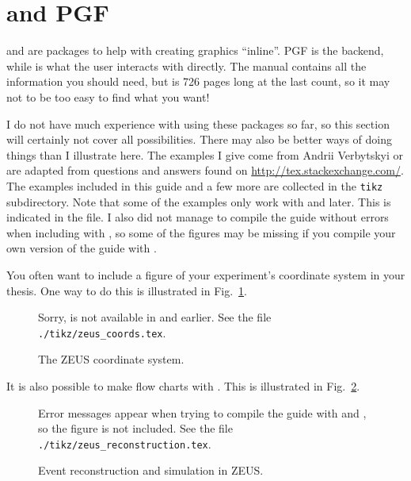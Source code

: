 \section{\TikZ and PGF}
\label{sec:fig:tikz}

 and  are packages to help with creating
graphics \enquote{inline}.  PGF is the backend, while \TikZ is what
the user interacts with directly. The manual contains all the
information you should need, but is 726 pages long at the last count,
so it may not to be too easy to find what you want!

I do not have much experience with using these packages so far, so
this section will certainly not cover all possibilities. There may
also be better ways of doing things than I illustrate here. The
examples I give come from Andrii Verbytskyi or are adapted from
questions and answers found on
\url{http://tex.stackexchange.com/}. The examples included in this
guide and a few more are collected in the \texttt{tikz}
subdirectory. Note that some of the examples only work with  and later. This is indicated in the file. I also did not manage
to compile the guide without errors when including  with
, so some of the figures may be missing if you compile
your own version of the guide with .

You often want to include a figure of your experiment's coordinate
system in your thesis. One way to do this is illustrated in
Fig.~\ref{fig:tikz:coord}.

\begin{figure}[htbp]
  \centering
   {%
    Sorry,  is not available in  and
    earlier. See the file \texttt{./tikz/zeus_coords.tex}.
  }{%
    
  }
  \caption{The ZEUS coordinate system.}
  \label{fig:tikz:coord}
\end{figure}

It is also possible to make flow charts with \TikZ. This is
illustrated in Fig.~\ref{fig:tikz:flow}.

\begin{figure}[htbp]
  \centering
   {%
    Error messages appear when trying to compile the guide with
     and , so the figure is not included.
    See the file \texttt{./tikz/zeus\_reconstruction.tex}.
  }{%
    
  }
  \caption[Event reconstruction and simulation in ZEUS]{Event reconstruction and simulation in ZEUS.}
  \label{fig:tikz:flow}
\end{figure}


